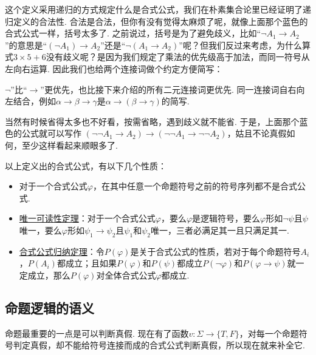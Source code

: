 \documentclass[main.tex]{subfiles}
\begin{document}
这个定义采用递归的方式规定什么是合式公式，我们在朴素集合论里已经证明了递归定义的合法性. 合法是合法，但你有没有觉得太麻烦了呢，就像上面那个蓝色的合式公式一样，括号太多了. 之前说过，括号是为了避免歧义，比如“\(\neg A_1 \to A_2\)”的意思是“\((\neg A_1) \to A_2\)”还是“\(\neg (A_1 \to A_2)\)”呢？但我们反过来考虑，为什么算式\(3\times 5+6\)没有歧义呢？是因为我们规定了乘法的优先级高于加法，而同一符号从左向右运算. 因此我们也给两个连接词做个约定方便简写：
\begin{reference}
    \(\neg\)”比“\(\to\)”更优先，也比接下来介绍的所有二元连接词更优先. \newline
    同一连接词自右向左结合，例如\(\alpha \to \beta \to \gamma\)是\(\alpha\to(\beta\to\gamma)\)的简写.
\end{reference}
当然有时候省得太多也不好看，按需省略，遇到歧义就不能省. 于是，上面那个蓝色的公式就可以写作{\color{blue} \((\neg\neg A_1 \to A_2) \to (\neg\neg A_1 \to \neg\neg A_2)\)}，姑且不论真假如何，至少这样看起来顺眼多了.

以上定义出的合式公式，有以下几个性质：
\begin{itemize}
    \item 对于一个合式公式\(\varphi\)，在其中任意一个命题符号之前的符号序列都不是合式公式.
    \item \uline{唯一可读性定理}：对于一个合式公式\(\varphi\)，要么\(\varphi\)是逻辑符号，要么\(\varphi\)形如\(\neg \psi\)且\(\psi\)唯一，要么\(\varphi\)形如\(\psi_1 \to \psi_2\)且\(\psi_1\)和\(\psi_2\)唯一，三者必满足其一且只满足其一.
    \item \uline{合式公式归纳定理}：令\(P(\varphi)\)是关于合式公式的性质，若对于每个命题符号\(A_i\)，\(P(A_i)\)都成立；且如果\(P(\varphi)\)和\(P(\psi)\)都成立\(P(\neg\varphi)\)和\(P(\varphi \to \psi)\)就一定成立，那么\(P(\varphi)\)对全体合式公式\(\varphi\)都成立.
\end{itemize}


\subsection{命题逻辑的语义}

命题最重要的一点是可以判断真假. 现在有了函数\(v: \Sigma \to \{T, F\}\)，对每一个命题符号判定真假，却不能给符号连接而成的合式公式判断真假，所以现在就来补全它.
\end{document}
